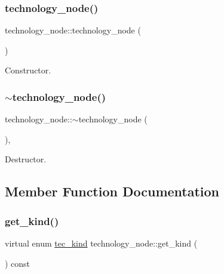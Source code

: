 \subsubsection{\texorpdfstring{technology\+\_\+node()}{technology\_node()}}
{\footnotesize\ttfamily technology\+\_\+node\+::technology\+\_\+node (\begin{DoxyParamCaption}{ }\end{DoxyParamCaption})\hspace{0.3cm}{\ttfamily [default]}}



Constructor. 

\mbox{\label{structtechnology__node_a4de897021b32eec8181ce09eea74a253}} 
\subsubsection{\texorpdfstring{$\sim$technology\+\_\+node()}{~technology\_node()}}
{\footnotesize\ttfamily technology\+\_\+node\+::$\sim$technology\+\_\+node (\begin{DoxyParamCaption}{ }\end{DoxyParamCaption})\hspace{0.3cm}{\ttfamily [virtual]}, {\ttfamily [default]}}



Destructor. 



\subsection{Member Function Documentation}
\mbox{\label{structtechnology__node_addc44daafd369586b8cee878d4df5e12}} 
\subsubsection{\texorpdfstring{get\+\_\+kind()}{get\_kind()}}
{\footnotesize\ttfamily virtual enum \hyperlink{technology__node_8hpp_ac8c5c7b9c4a4b68049cd228ba6042de2}{tec\+\_\+kind} technology\+\_\+node\+::get\+\_\+kind (\begin{DoxyParamCaption}{ }\end{DoxyParamCaption}) const\hspace{0.3cm}{\ttfamily [pure virtual]}}



